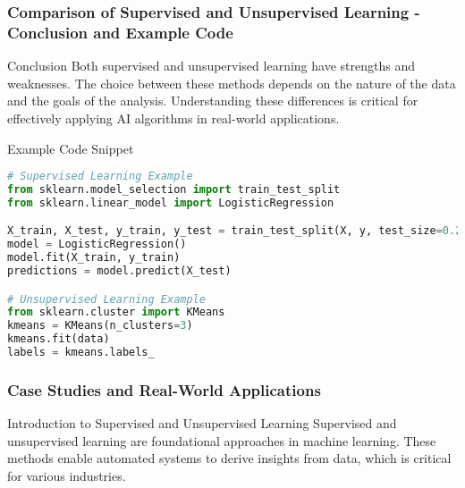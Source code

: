 \documentclass{beamer}
\begin{document}
\begin{frame}[fragile]
    \frametitle{Comparison of Supervised and Unsupervised Learning - Conclusion and Example Code}
    \begin{block}{Conclusion}
        Both supervised and unsupervised learning have strengths and weaknesses. The choice between these methods depends on the nature of the data and the goals of the analysis. Understanding these differences is critical for effectively applying AI algorithms in real-world applications.
    \end{block}
    
    \begin{block}{Example Code Snippet}
        \begin{lstlisting}[language=Python]
# Supervised Learning Example
from sklearn.model_selection import train_test_split
from sklearn.linear_model import LogisticRegression

X_train, X_test, y_train, y_test = train_test_split(X, y, test_size=0.2)
model = LogisticRegression()
model.fit(X_train, y_train)
predictions = model.predict(X_test)

# Unsupervised Learning Example
from sklearn.cluster import KMeans
kmeans = KMeans(n_clusters=3)
kmeans.fit(data)
labels = kmeans.labels_
        \end{lstlisting}
    \end{block}
\end{frame}

\begin{frame}[fragile]
    \frametitle{Case Studies and Real-World Applications}
    \begin{block}{Introduction to Supervised and Unsupervised Learning}
        Supervised and unsupervised learning are foundational approaches in machine learning. These methods enable automated systems to derive insights from data, which is critical for various industries.
    \end{block}
\end{frame}
\end{document}
